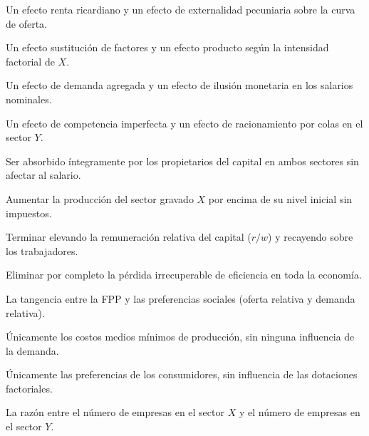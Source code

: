 \begin{opts}
    \item Un efecto renta ricardiano y un efecto de externalidad pecuniaria sobre la curva de oferta.
    \item Un efecto sustitución de factores y un efecto producto según la intensidad factorial de $X$.
    \item Un efecto de demanda agregada y un efecto de ilusión monetaria en los salarios nominales.
    \item Un efecto de competencia imperfecta y un efecto de racionamiento por colas en el sector $Y$.
\end{opts}

\begin{opts}
    \item Ser absorbido íntegramente por los propietarios del capital en ambos sectores sin afectar al salario.
    \item Aumentar la producción del sector gravado $X$ por encima de su nivel inicial sin impuestos.
    \item Terminar elevando la remuneración relativa del capital ($r/w$) y recayendo sobre los trabajadores.
    \item Eliminar por completo la pérdida irrecuperable de eficiencia en toda la economía.
\end{opts}

\begin{opts}
    \item La tangencia entre la FPP y las preferencias sociales (oferta relativa y demanda relativa).
    \item Únicamente los costos medios mínimos de producción, sin ninguna influencia de la demanda.
    \item Únicamente las preferencias de los consumidores, sin influencia de las dotaciones factoriales.
    \item La razón entre el número de empresas en el sector $X$ y el número de empresas en el sector $Y$.
\end{opts}

